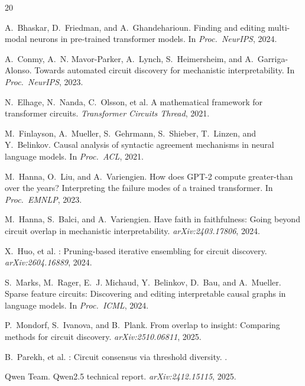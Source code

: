 \documentclass[11pt,a4paper]{article}
\begin{document}

\begin{thebibliography}{20}

A.~Bhaskar, D.~Friedman, and A.~Ghandeharioun.
\newblock Finding and editing multi-modal neurons in pre-trained transformer models.
\newblock In \emph{Proc.\ NeurIPS}, 2024.

A.~Conmy, A.~N. Mavor-Parker, A.~Lynch, S.~Heimersheim, and A.~Garriga-Alonso.
\newblock Towards automated circuit discovery for mechanistic interpretability.
\newblock In \emph{Proc.\ NeurIPS}, 2023.

N.~Elhage, N.~Nanda, C.~Olsson, et al.
\newblock A mathematical framework for transformer circuits.
\newblock \emph{Transformer Circuits Thread}, 2021.

M.~Finlayson, A.~Mueller, S.~Gehrmann, S.~Shieber, T.~Linzen, and Y.~Belinkov.
\newblock Causal analysis of syntactic agreement mechanisms in neural language models.
\newblock In \emph{Proc.\ ACL}, 2021.

M.~Hanna, O.~Liu, and A.~Variengien.
\newblock How does {GPT-2} compute greater-than over the years? {I}nterpreting the failure modes of a trained transformer.
\newblock In \emph{Proc.\ EMNLP}, 2023.

M.~Hanna, S.~Balci, and A.~Variengien.
\newblock Have faith in faithfulness: Going beyond circuit overlap in mechanistic interpretability.
\newblock \emph{arXiv:2403.17806}, 2024.

X.~Huo, et al.
: Pruning-based iterative ensembling for circuit discovery.
\newblock \emph{arXiv:2604.16889}, 2024.

S.~Marks, M.~Rager, E.~J. Michaud, Y.~Belinkov, D.~Bau, and A.~Mueller.
\newblock Sparse feature circuits: Discovering and editing interpretable causal graphs in language models.
\newblock In \emph{Proc.\ ICML}, 2024.

P.~Mondorf, S.~Ivanova, and B.~Plank.
\newblock From overlap to insight: Comparing methods for circuit discovery.
\newblock \emph{arXiv:2510.06811}, 2025.

B.~Parekh, et al.
: Circuit consensus via threshold diversity.
.

{Qwen Team}.
\newblock Qwen2.5 technical report.
\newblock \emph{arXiv:2412.15115}, 2025.


\end{thebibliography}
\end{document}
